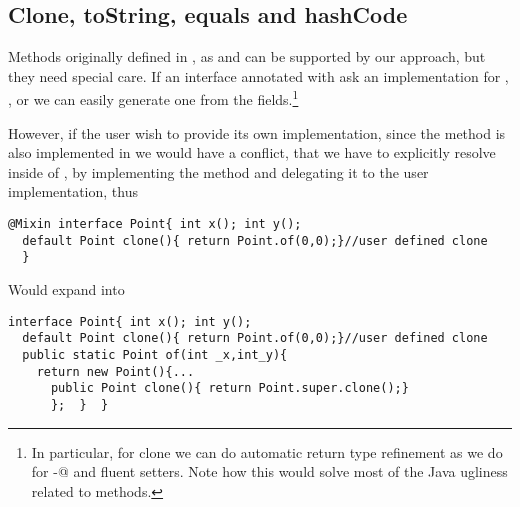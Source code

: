 \subsection{Clone, toString, equals and hashCode}
Methods originally defined in \Q@Object@, as \Q@clone@ and \Q@toString@ can be supported by our approach, but they need special care. If an interface annotated with \mixin ask an implementation for \Q@clone@, \Q@toString@, \Q@equals@ or \Q@hashCode@ we can easily generate one from the fields.\footnote{In particular, for clone we can do automatic return type refinement as we do for \Q@with-@ and fluent setters. Note how this would solve most of the Java ugliness related to \Q@clone@ methods.}

However, if the user wish to provide its own implementation, since the method is also implemented in \Q@Object@ we would have a conflict, that we have to explicitly resolve inside of \Q@of@, by implementing the method and delegating it to the user implementation, thus

\begin{lstlisting}
@Mixin interface Point{ int x(); int y();
  default Point clone(){ return Point.of(0,0);}//user defined clone
  }
\end{lstlisting} 
Would expand into 

\begin{lstlisting}
interface Point{ int x(); int y();
  default Point clone(){ return Point.of(0,0);}//user defined clone
  public static Point of(int _x,int_y){
    return new Point(){...
      public Point clone(){ return Point.super.clone();}
      };  }  }
\end{lstlisting} 
